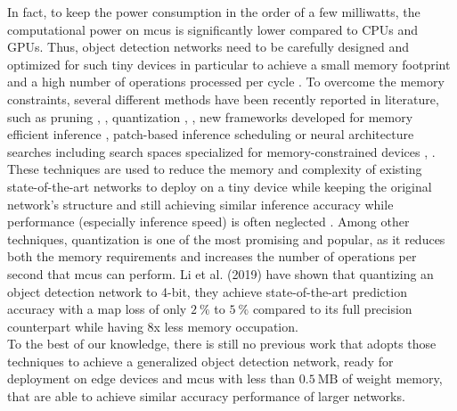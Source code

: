 \documentclass[conference]{IEEEtran}
\begin{document}
In fact, to keep the power consumption in the order of a few milliwatts, the computational power on \glspl{mcu} is significantly lower compared to CPUs and GPUs. Thus, object detection networks need to be carefully designed and optimized for such tiny devices in particular to achieve a small memory footprint and a high number of operations processed per cycle \cite{wang2020fann}. To overcome the memory constraints, several different methods have been recently reported in literature, such as pruning \cite{zhu_prune_2017}, \cite{molchanov_pruning_2017}, quantization \cite{gholami_survey_2021}, \cite{han_deep_2016}, new frameworks developed for memory efficient inference \cite{lin_mcunet_2020}, patch-based inference scheduling \cite{lin_mcunetv2_2021} or neural architecture searches including search spaces specialized for memory-constrained devices \cite{cai_once-for-all_2020}, \cite{cai_-device_2019}. These techniques are used to reduce the memory and complexity of existing state-of-the-art networks to deploy on a tiny device while keeping the original network's structure and still achieving similar inference accuracy while performance (especially inference speed) is often neglected \cite{scherer2021tinyradarnn}. Among other techniques, quantization is one of the most promising and popular, as it reduces both the memory requirements and increases the number of operations per second that \glspl{mcu} can perform. Li et al. (2019) \cite{li_fully_2019} have shown that quantizing an object detection network to 4-bit, they achieve state-of-the-art prediction accuracy with a \gls{map} loss of only $\SI{2}{\percent}$ to $\SI{5}{\percent}$ compared to its full precision counterpart while having 8x less memory occupation. \\ To the best of our knowledge, there is still no previous work that adopts those techniques to achieve a generalized object detection network, ready for deployment on edge devices and \glspl{mcu} with less than $\SI{0.5}{\text{MB}}$ of weight memory, that are able to achieve similar accuracy performance of larger networks.
\end{document}
